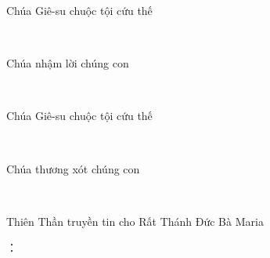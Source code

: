 \documentclass[12pt]{article}
\begin{document}
\begin{paracol}{2}
\begin{rightcolumn}
Chúa Giê-su chuộc tội cứu thế\\
\end{rightcolumn}

\begin{leftcolumn*}
\Large{\ \ \ }\\
\end{leftcolumn*}

\begin{rightcolumn}
Chúa nhậm lời chúng con\\
\end{rightcolumn}

\begin{leftcolumn*}
\Large{\ \ \ \ \ \ \ \ }\\
\end{leftcolumn*}

\begin{rightcolumn}
Chúa Giê-su chuộc tội cứu thế\\
\end{rightcolumn}

\begin{leftcolumn*}
\Large{\ \ \ }\\
\end{leftcolumn*}

\begin{rightcolumn}
Chúa thương xót chúng con\\
\end{rightcolumn}

\begin{leftcolumn*}
\Large{\ \ \ \ \ \ }\\				
\end{leftcolumn*}

\begin{rightcolumn}
Thiên Thần truyền tin cho Rất Thánh Đức Bà Maria\\
\end{rightcolumn}

\begin{leftcolumn*}
\Large{：\ \ \ \ \ \ \ }\\
\end{leftcolumn*}


\end{paracol}
\end{document}
